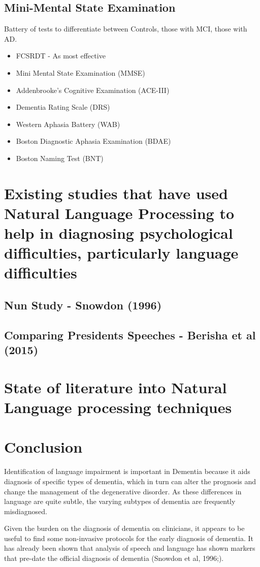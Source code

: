 \documentclass[a4paper]{article}
\begin{document}
\subsection{Mini-Mental State Examination}

Battery of tests to differentiate between Controls, those with MCI, those with AD. 
\begin{itemize}
	\item FCSRDT - As most effective 
	\item Mini Mental State Examination (MMSE)
	\item Addenbrooke's Cognitive Examination (ACE-III)
	\item Dementia Rating Scale (DRS)
	\item Western Aphasia Battery (WAB)
	\item Boston Diagnostic Aphasia Examination (BDAE)
	\item Boston Naming Test (BNT)
\end{itemize}

\section{Existing studies that have used Natural Language Processing to help in diagnosing psychological difficulties, particularly language difficulties}

\subsection{Nun Study - Snowdon (1996)}
\subsection{Comparing Presidents Speeches - Berisha et al (2015)}

\section{State of literature into Natural Language processing techniques}

\section{Conclusion}
\par
Identification of language impairment is important in Dementia because it aids diagnosis of specific types of dementia, which in turn can alter the prognosis and change the management of the degenerative disorder. As these differences in language are quite subtle, the varying subtypes of dementia are frequently misdiagnosed.
\newline
\par 
Given the burden on the diagnosis of dementia on clinicians, it appears to be useful to find some non-invasive protocols for the early diagnosis of dementia. It has already been shown that analysis of speech and language has shown markers that pre-date the official diagnosis of dementia (Snowdon et al, 1996;)\cite{Berisha2015}.



\end{document}
